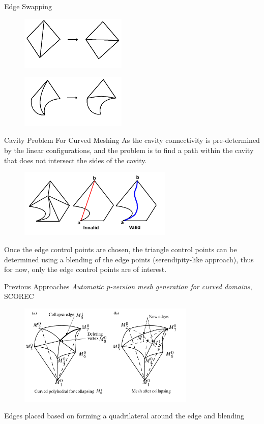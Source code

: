 \documentclass[12pt]{beamer}
\begin{document}
\begin{frame}{Edge Swapping}
\begin{figure}
  \centering
  \includegraphics[width=0.45\textwidth]{bezier_images/swap1.png} 
\end{figure}
\begin{figure}
  \centering
  \includegraphics[width=0.45\textwidth]{bezier_images/swap2.png} 
\end{figure}
\end{frame}
\begin{frame}{Cavity Problem For Curved Meshing}
As the cavity connectivity is pre-determined by the linear configurations, and the problem is to find a path within the cavity that does not intersect the sides of the cavity.
\begin{figure}
  \centering
  \includegraphics[width=0.65\textwidth]{bezier_images/collapse4.png} 
\end{figure}
Once the edge control points are chosen, the triangle control points can be determined using a blending of the edge points (serendipity-like approach), thus for now, only the edge control points are of interest.
\end{frame}
\begin{frame}{Previous Approaches}
\textit{Automatic p-version mesh generation for curved domains}, SCOREC 
\begin{figure}
  \centering
  \includegraphics[width=0.75\textwidth]{bezier_images/collapseOld2.png} 
\end{figure}
Edges placed based on forming a quadrilateral around the edge and blending
\end{frame}
\end{document}
